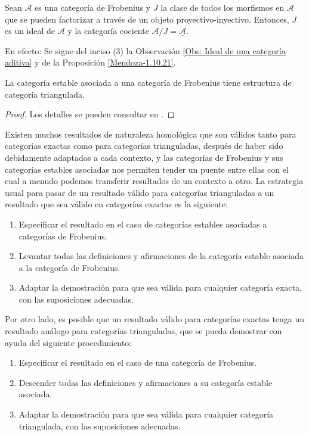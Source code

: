 \documentclass[tesis]{subfiles}
\begin{document}
\begin{Obs}\label{Obs: Categorías de Frobenius}
    Sean $\mathscr{A}$ es una categoría de Frobenius y $J$ la clase de todos los morfismos en $\mathscr{A}$ que se pueden factorizar a través de un objeto proyectivo-inyectivo. Entonces, $J$ es un ideal de $\mathscr{A}$ y la categoría cociente $\mathscr{A}/J = \underline{\mathscr{A}}$. 

    \vspace{1mm}
    En efecto: Se sigue del inciso (3) la Observación \ref{Obs: Ideal de una categoría aditiva} y de la Proposición \ref{Mendoza-1.10.21}.
\end{Obs}

\begin{Prop}\label{Happel-2.6}
    La categoría estable asociada a una categoría de Frobenius tiene estructura de categoría triangulada.
\end{Prop}

\begin{proof}
    Los detalles se pueden consultar en \cite[Chapter~2]{Arentz-Hansen}.
\end{proof}

Existen muchos resultados de naturaleza homológica que son válidos tanto para categorías exactas como para categorías trianguladas, después de haber sido debidamente adaptados a cada contexto, y las categorías de Frobenius y sus categorías estables asociadas nos permiten tender un puente entre ellas con el cual a menudo podemos transferir resultados de un contexto a otro. La estrategia usual para pasar de un resultado válido para categorías trianguladas a un resultado que sea válido en categorías exactas es la siguiente:
\begin{enumerate}[label=(\arabic*)]

    \item Especificar el resultado en el caso de categorías estables asociadas a categorías de Frobenius.

    \item Levantar todas las definiciones y afirmaciones de la categoría estable asociada a la categoría de Frobenius.

    \item Adaptar la demostración para que sea válida para cualquier categoría exacta, con las suposiciones adecuadas.
\end{enumerate}

\noindent Por otro lado, es posible que un resultado válido para categorías exactas tenga un resultado análogo para categorías trianguladas, que se pueda demostrar con ayuda del siguiente procedimiento:
\begin{enumerate}[label=(\arabic*)]

    \item Especificar el resultado en el caso de una categoría de Frobenius.

    \item Descender todas las definiciones y afirmaciones a su categoría estable asociada.

    \item Adaptar la demostración para que sea válida para cualquier categoría triangulada, con las suposiciones adecuadas.
\end{enumerate}
\end{document}
